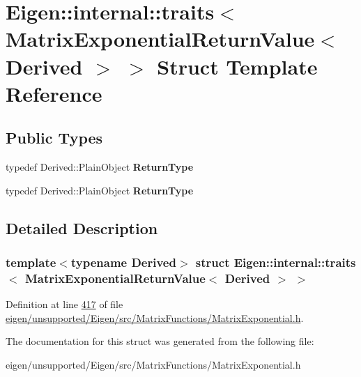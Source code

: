 \hypertarget{struct_eigen_1_1internal_1_1traits_3_01_matrix_exponential_return_value_3_01_derived_01_4_01_4}{}\section{Eigen\+:\+:internal\+:\+:traits$<$ Matrix\+Exponential\+Return\+Value$<$ Derived $>$ $>$ Struct Template Reference}
\label{struct_eigen_1_1internal_1_1traits_3_01_matrix_exponential_return_value_3_01_derived_01_4_01_4}
\subsection*{Public Types}
\begin{DoxyCompactItemize}
\item 
\mbox{\label{struct_eigen_1_1internal_1_1traits_3_01_matrix_exponential_return_value_3_01_derived_01_4_01_4_a3a9c5d23e24968ea3fba4da3021e74be}} 
typedef Derived\+::\+Plain\+Object {\bfseries Return\+Type}
\item 
\mbox{\label{struct_eigen_1_1internal_1_1traits_3_01_matrix_exponential_return_value_3_01_derived_01_4_01_4_a3a9c5d23e24968ea3fba4da3021e74be}} 
typedef Derived\+::\+Plain\+Object {\bfseries Return\+Type}
\end{DoxyCompactItemize}


\subsection{Detailed Description}
\subsubsection*{template$<$typename Derived$>$\newline
struct Eigen\+::internal\+::traits$<$ Matrix\+Exponential\+Return\+Value$<$ Derived $>$ $>$}



Definition at line \hyperlink{eigen_2unsupported_2_eigen_2src_2_matrix_functions_2_matrix_exponential_8h_source_l00417}{417} of file \hyperlink{eigen_2unsupported_2_eigen_2src_2_matrix_functions_2_matrix_exponential_8h_source}{eigen/unsupported/\+Eigen/src/\+Matrix\+Functions/\+Matrix\+Exponential.\+h}.



The documentation for this struct was generated from the following file\+:\begin{DoxyCompactItemize}
\item 
eigen/unsupported/\+Eigen/src/\+Matrix\+Functions/\+Matrix\+Exponential.\+h\end{DoxyCompactItemize}
